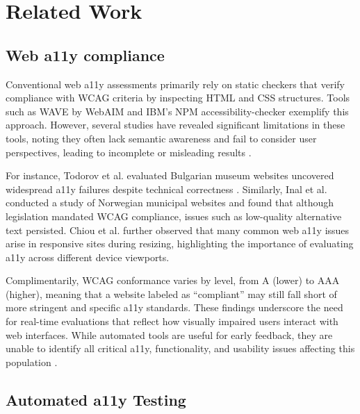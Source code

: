 
\section{Related Work}
\subsection{Web a11y compliance}

Conventional web \ac{a11y} assessments primarily rely on static checkers that verify compliance with \ac{WCAG} criteria by inspecting HTML and CSS structures. Tools such as WAVE by WebAIM\cite{webaim_wave_2025} and IBM's NPM accessibility-checker\cite{ibm_accessibility_checker_2025} exemplify this approach. However, several studies have revealed significant limitations in these tools, noting they often lack semantic awareness and fail to consider user perspectives, leading to incomplete or misleading results \cite{ara2024inclusive}. 

For instance, Todorov et al. evaluated Bulgarian museum websites uncovered widespread \ac{a11y} failures despite technical correctness \cite{todorov2022accessibility}. Similarly, Inal et al. conducted a study of Norwegian municipal websites and found that although legislation mandated \ac{WCAG} compliance, issues such as low-quality alternative text persisted.
Chiou et al. further observed that many common web \ac{a11y} issues arise in responsive sites during resizing, highlighting the importance of evaluating \ac{a11y} across different device viewports\cite{chiou2024automatically}.

Complimentarily, \ac{WCAG} conformance varies by level, from A (lower) to AAA (higher), meaning that a website labeled as “compliant” may still fall short of more stringent and specific \ac{a11y} standards. These findings underscore the need for real-time evaluations that reflect how visually impaired users interact with web interfaces. 
While automated tools are useful for early feedback, they are unable to identify all critical \ac{a11y}, functionality, and usability issues affecting this population \cite{todorov2022accessibility}.

\subsection{Automated a11y Testing}

